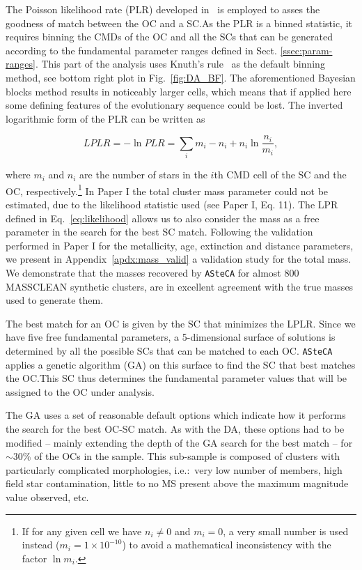 \documentclass{aa}
\begin{document}
The Poisson likelihood rate (PLR) developed in~\cite{Dolphin_2002} is employed
to asses the goodness of match between the OC and a SC.\@ As the PLR is a
binned statistic, it requires binning the CMDs of the OC and all the SCs that
can be generated according to the fundamental parameter ranges defined in Sect.
\ref{ssec:param-ranges}. This part of the analysis uses Knuth's
rule~\citep[][also implemented via the astroML package]{Knuth_2006} as the
default binning method, see bottom right plot in Fig.~\ref{fig:DA_BF}.
The aforementioned Bayesian blocks method results in noticeably larger cells,
which means that if applied here some defining features of the evolutionary
sequence could be lost.
%
The inverted logarithmic form of the PLR can be written as

\begin{equation}
LPLR  = -\ln PLR = \sum_i m_i - n_i + n_i \ln \frac{n_i}{m_i},
\label{eq:likelihood}
\end{equation}

\noindent where $m_i$ and $n_i$ are the number of stars in the $i$th CMD cell of
the SC and the OC, respectively.\footnote{If for any given cell we have
$n_i\neq0$ and $m_i=0$, a very small number is used instead ($m_i=1{\times}10^
{-10}$) to avoid a mathematical inconsistency with the factor $\ln m_i$.}
%
In Paper I the total cluster mass parameter could not be estimated, due to the
likelihood statistic used (see Paper I, Eq. 11). The LPR defined in
Eq.~\ref{eq:likelihood} allows us to also consider the mass as a free parameter
in the search for the best SC match. Following the validation performed in Paper
I for the metallicity, age, extinction and distance parameters, we present in
Appendix~\ref{apdx:mass_valid} a validation study for the total mass. We
demonstrate that the masses recovered by \texttt{ASteCA} for almost 800
MASSCLEAN synthetic clusters, are in excellent agreement with the true masses
used to generate them.

The best match for an OC is given by the SC that minimizes the LPLR.\@
Since we have five free fundamental parameters, a 5-dimensional surface of
solutions is determined by all the possible SCs that can be matched to each
OC.\@
%
\texttt{ASteCA} applies a genetic algorithm (GA) on this surface to find the SC
that best matches the OC.\@ This SC thus determines the fundamental parameter
values that will be assigned to the OC under analysis.\@

The GA uses a set of reasonable default options which indicate how it performs
the search for the best OC-SC match.
As with the DA, these options had to be modified -- mainly extending the depth
of the GA search for the best match -- for $\sim$30\% of the OCs in the
sample. This sub-sample is composed of clusters
with particularly complicated morphologies, i.e.:\ very low number of members,
high field star contamination, little to no MS present above the
maximum magnitude value observed, etc. 
\end{document}
